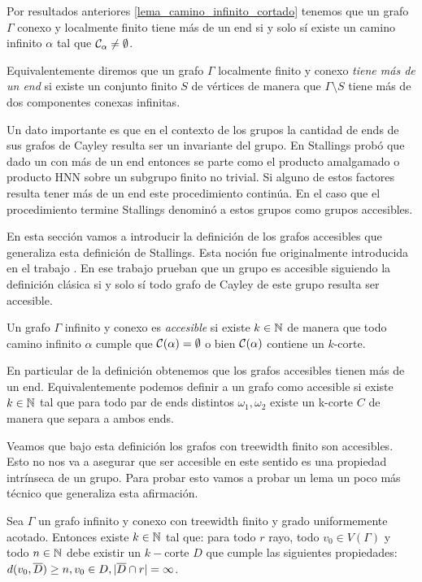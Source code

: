 \documentclass[tesis.tex]{subfiles}
\begin{document}
Por resultados anteriores \ref{lema_camino_infinito_cortado} tenemos que un grafo $\Gamma$ conexo y localmente finito tiene más de un end si y solo sí existe un camino infinito $\alpha$ tal que ${\cal C}_{\alpha} \neq \emptyset$.

Equivalentemente diremos que un grafo $\Gamma$ localmente finito y conexo \emph{tiene más de un end} si existe un conjunto finito $S$ de vértices de manera que $\Gamma \setminus S$ tiene más de dos componentes conexas infinitas.

Un dato importante es que en el contexto de los grupos la cantidad de ends de sus grafos de Cayley resulta ser un invariante del grupo.
En \cite{stallings1971group} Stallings probó que dado un \fg con más de un end entonces se parte como el producto amalgamado o producto HNN sobre un subgrupo finito no trivial.
Si alguno de estos factores resulta tener más de un end este procedimiento continúa.
En el caso que el procedimiento termine Stallings denominó a estos grupos como grupos accesibles. 

En esta sección vamos a introducir la definición de los grafos accesibles que generaliza esta definición de Stallings.
Esta noción fue originalmente introducida en el trabajo \cite{thomassen1993vertex}.
En ese trabajo prueban que un grupo es accesible siguiendo la definición clásica si y solo sí todo grafo de Cayley de este grupo resulta ser accesible.
\begin{deff}
	Un grafo $\Gamma$ infinito y conexo es \emph{accesible} si existe $k \in \mathbb{N}$ de manera que todo camino infinito $\alpha$ cumple que ${\cal C}(\alpha) = \emptyset$ o bien ${\cal C}(\alpha)$ contiene un $k$-corte.
\end{deff}
En particular de la definición obtenemos que los grafos accesibles tienen más de un end.
Equivalentemente podemos definir a un grafo como accesible si existe $k \in \mathbb{N}$ tal que para todo par de ends distintos $\omega_1, \omega_2$ existe un k-corte $C$ de manera que separa a ambos ends.


Veamos que bajo esta definición los grafos con treewidth finito son accesibles.
Esto no nos va a asegurar que ser accesible en este sentido es una propiedad intrínseca de un grupo.
Para probar esto vamos a probar un lema un poco más técnico que generaliza esta afirmación.

\begin{lema}\label{lema_corte_treewidth}
	Sea $\Gamma$ un grafo infinito y conexo con treewidth finito y grado uniformemente acotado.
	Entonces existe $k \in \mathbb{N}$ tal que:
	para todo $r$ rayo, todo $v_0 \in V(\Gamma)$ y todo $n \in \mathbb{N}$ debe existir un $k-$corte $D$ que cumple las siguientes propiedades: $d(v_0,\overline D) \ge n, v_0 \in D, |\overline D \cap r| = \infty$. 
\end{lema}
\end{document}
